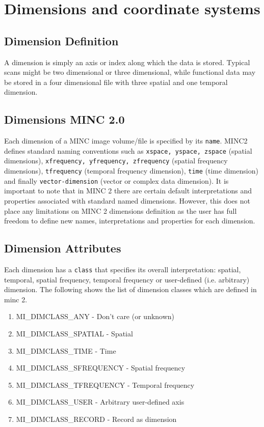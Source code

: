 \documentclass{article}
\begin{document}
\section{Dimensions and coordinate systems}
\subsection{Dimension Definition}
A dimension is simply an axis or index along which the data is stored.  
Typical scans might be two dimensional or three dimensional, while functional 
data may be stored in a four dimensional file with three spatial and one temporal 
dimension.
\subsection{Dimensions MINC 2.0}
Each dimension of a MINC image volume/file is specified by its {\tt name}. MINC2 defines
standard naming conventions such as {\tt xspace, yspace, zspace} (spatial 
dimensions), {\tt xfrequency, yfrequency, zfrequency}
(spatial frequency dimensions), {\tt tfrequency} (temporal frequency dimension), {\tt time} 
(time dimension) and finally {\tt vector-dimension} (vector or complex data dimension).
It is important to note that in MINC 2 there are certain default interpretations and properties 
associated with standard named dimensions. However, this does not place 
any limitations on MINC 2 dimensions definition as the user has full freedom to define new names, 
interpretations and properties for each dimension.
\subsection{Dimension Attributes}
Each dimension has a {\tt class} that specifies its overall interpretation: spatial, 
temporal, spatial frequency, temporal frequency or user-defined (i.e. arbitrary) dimension.
The following shows the list of dimension classes which are defined in minc 2.
\begin{enumerate}
\item MI\_DIMCLASS\_ANY        - Don't care (or unknown)
\item MI\_DIMCLASS\_SPATIAL    - Spatial
\item MI\_DIMCLASS\_TIME       - Time
\item MI\_DIMCLASS\_SFREQUENCY - Spatial frequency
\item MI\_DIMCLASS\_TFREQUENCY - Temporal frequency
\item MI\_DIMCLASS\_USER       - Arbitrary user-defined axis
\item MI\_DIMCLASS\_RECORD     - Record as dimension
\end{enumerate}
\end{document}
